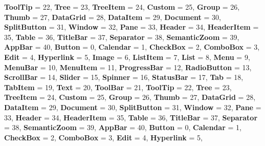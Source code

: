 \begin{DoxyCompactItemize}
{\bfseries Tool\+Tip} = 22, 
{\bfseries Tree} = 23, 
\newline
{\bfseries Tree\+Item} = 24, 
{\bfseries Custom} = 25, 
{\bfseries Group} = 26, 
{\bfseries Thumb} = 27, 
\newline
{\bfseries Data\+Grid} = 28, 
{\bfseries Data\+Item} = 29, 
{\bfseries Document} = 30, 
{\bfseries Split\+Button} = 31, 
\newline
{\bfseries Window} = 32, 
{\bfseries Pane} = 33, 
{\bfseries Header} = 34, 
{\bfseries Header\+Item} = 35, 
\newline
{\bfseries Table} = 36, 
{\bfseries Title\+Bar} = 37, 
{\bfseries Separator} = 38, 
{\bfseries Semantic\+Zoom} = 39, 
\newline
{\bfseries App\+Bar} = 40, 
{\bfseries Button} = 0, 
{\bfseries Calendar} = 1, 
{\bfseries Check\+Box} = 2, 
\newline
{\bfseries Combo\+Box} = 3, 
{\bfseries Edit} = 4, 
{\bfseries Hyperlink} = 5, 
{\bfseries Image} = 6, 
\newline
{\bfseries List\+Item} = 7, 
{\bfseries List} = 8, 
{\bfseries Menu} = 9, 
{\bfseries Menu\+Bar} = 10, 
\newline
{\bfseries Menu\+Item} = 11, 
{\bfseries Progress\+Bar} = 12, 
{\bfseries Radio\+Button} = 13, 
{\bfseries Scroll\+Bar} = 14, 
\newline
{\bfseries Slider} = 15, 
{\bfseries Spinner} = 16, 
{\bfseries Status\+Bar} = 17, 
{\bfseries Tab} = 18, 
\newline
{\bfseries Tab\+Item} = 19, 
{\bfseries Text} = 20, 
{\bfseries Tool\+Bar} = 21, 
{\bfseries Tool\+Tip} = 22, 
\newline
{\bfseries Tree} = 23, 
{\bfseries Tree\+Item} = 24, 
{\bfseries Custom} = 25, 
{\bfseries Group} = 26, 
\newline
{\bfseries Thumb} = 27, 
{\bfseries Data\+Grid} = 28, 
{\bfseries Data\+Item} = 29, 
{\bfseries Document} = 30, 
\newline
{\bfseries Split\+Button} = 31, 
{\bfseries Window} = 32, 
{\bfseries Pane} = 33, 
{\bfseries Header} = 34, 
\newline
{\bfseries Header\+Item} = 35, 
{\bfseries Table} = 36, 
{\bfseries Title\+Bar} = 37, 
{\bfseries Separator} = 38, 
\newline
{\bfseries Semantic\+Zoom} = 39, 
{\bfseries App\+Bar} = 40, 
{\bfseries Button} = 0, 
{\bfseries Calendar} = 1, 
\newline
{\bfseries Check\+Box} = 2, 
{\bfseries Combo\+Box} = 3, 
{\bfseries Edit} = 4, 
{\bfseries Hyperlink} = 5, 

\end{DoxyCompactItemize}
